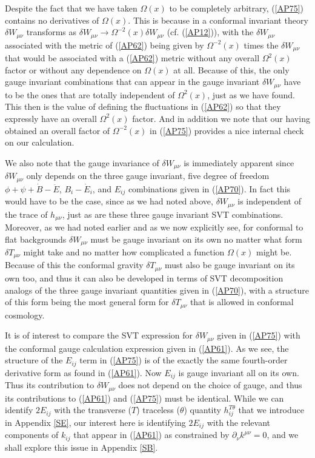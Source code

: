 \documentclass[aps]{revtex4}
\begin{document}
Despite the fact that we have taken $\Omega(x)$ to be completely arbitrary, (\ref{AP75}) contains no derivatives of $\Omega(x)$. This is because in a conformal invariant theory $\delta W_{\mu\nu}$ transforms as $\delta W_{\mu\nu}\rightarrow \Omega^{-2}(x)\delta W_{\mu\nu}$ (cf. (\ref{AP12})), with the $\delta W_{\mu\nu}$ associated with the metric of (\ref{AP62}) being given by $\Omega^{-2}(x)$ times the $\delta W_{\mu\nu}$ that would be associated with a (\ref{AP62}) metric without any overall $\Omega^2(x)$ factor or without any dependence on $\Omega(x)$ at all. Because of this, the only gauge invariant combinations that can appear in the gauge invariant $\delta W_{\mu\nu}$ have to be the ones that are totally independent of $\Omega^2(x)$, just as we have found. This then is the value of defining the fluctuations in (\ref{AP62}) so that they expressly have an overall $\Omega^2(x)$ factor. And in addition we note that our having obtained an overall factor of $\Omega^{-2}(x)$ in (\ref{AP75}) provides a nice internal check on our calculation.

We also note that the gauge invariance of $\delta W_{\mu\nu}$ is immediately apparent since $\delta W_{\mu\nu}$ only depends on the three gauge invariant, five degree of freedom  $\phi+\psi+\dot{B}-\ddot{E}$, $B_i-\dot{E}_i$, and $E_{ij}$ combinations given in (\ref{AP70}).  In fact this would have to be the case, since as we had noted above, $\delta W_{\mu\nu}$ is independent of  the trace of $h_{\mu\nu}$, just as are these three gauge invariant SVT combinations. Moreover, as we had noted earlier and as we now explicitly see, for conformal to flat backgrounds $\delta W_{\mu\nu}$ must be gauge invariant on its own no matter what form $\delta T_{\mu\nu}$ might take and no matter how complicated a function $\Omega(x)$ might be. Because of this the conformal gravity $\delta T_{\mu\nu}$ must also be gauge invariant on its own too, and thus it can also be developed in terms of  SVT decomposition analogs of the three gauge invariant quantities given in (\ref{AP70}), with a structure of this form being the most general form for  $\delta T_{\mu\nu}$ that is allowed in conformal cosmology.

It is of interest to compare the SVT expression for $\delta W_{\mu\nu}$ given in  (\ref{AP75}) with  the conformal gauge calculation expression given in (\ref{AP61}). As we see, the structure of the $E_{ij}$ term in (\ref{AP75}) is of the exactly the same fourth-order derivative form as found in (\ref{AP61}). Now $E_{ij}$ is gauge invariant all on its own. Thus its contribution to $\delta W_{\mu\nu}$ does not depend on the choice of gauge, and thus its contributions to (\ref{AP61}) and (\ref{AP75}) must be identical. While  we can identify $2E_{ij}$ with the transverse ($T$) traceless ($\theta$) quantity $h_{ij}^{T\theta}$ that we introduce in Appendix \ref{SE}, our interest here is  identifying $2E_{ij}$ with the relevant components of $k_{ij}$ that appear in (\ref{AP61}) as constrained by  $\partial_{\nu}k^{\mu\nu}=0$, and we shall explore this issue in Appendix \ref{SB}. 
\end{document}
